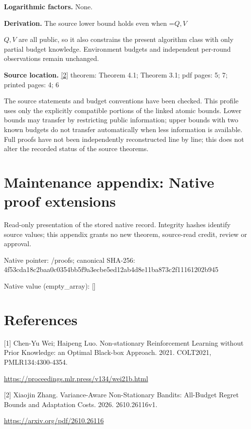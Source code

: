 \documentclass[10pt,a4paper]{article}
\newcommand{\AtlasMath}[1]{\par\begingroup\centering\setbox0=\hbox{$\displaystyle #1$}\ifdim\wd0>1.4\linewidth\typeout{ATLAS WIDE FORMULA: \the\wd0}\fi\ifdim\wd0>\linewidth\resizebox{\linewidth}{!}{\box0}\else\box0\fi\par\endgroup}
\newcommand{\AtlasInlineMath}[1]{\begingroup\setbox0=\hbox{$#1$}\ifdim\wd0>.4\linewidth\endgroup\AtlasMath{#1}\else\endgroup$#1$\fi}
\begin{document}
\textbf{Logarithmic factors.} None.



\textbf{Derivation.} The source lower bound holds even when \AtlasInlineMath{Q,V} are all public, so it also constrains the present algorithm class with only partial budget knowledge. Environment budgets and independent per-round observations remain unchanged.



\textbf{Source location.} \href{https://arxiv.org/pdf/2610.26116}{[2]} theorem: Theorem 4.1; Theorem 3.1; pdf pages: 5; 7; printed pages: 4; 6



The source statements and budget conventions have been checked. This profile uses only the explicitly compatible portions of the linked atomic bounds. Lower bounds may transfer by restricting public information; upper bounds with two known budgets do not transfer automatically when less information is available. Full proofs have not been independently reconstructed line by line; this does not alter the recorded status of the source theorems.



\section{Maintenance appendix: Native proof extensions}


Read-only presentation of the stored native record. Integrity hashes identify source values; this appendix grants no new theorem, source-read credit, review or approval.



Native pointer: /proofs; canonical SHA-256: 4f53cda18c2baa0c0354bb5f\allowbreak{}9a3ecbe5ed12ab4d8e11ba87\allowbreak{}3c2f11161202b945



Native value (empty\_array): []



\section{References}


[1] Chen-Yu Wei; Haipeng Luo. Non-stationary Reinforcement Learning without Prior Knowledge: an Optimal Black-box Approach. 2021. COLT2021, PMLR134:4300-4354.



\url{https://proceedings.mlr.press/v134/wei21b.html}



[2] Xiaojin Zhang. Variance-Aware Non-Stationary Bandits: All-Budget Regret Bounds and Adaptation Costs. 2026. 2610.26116v1.



\url{https://arxiv.org/pdf/2610.26116}
\end{document}
